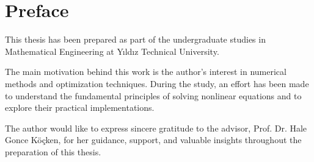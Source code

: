 \chapter*{Preface}
This thesis has been prepared as part of the undergraduate studies in Mathematical Engineering at Yıldız Technical University.

The main motivation behind this work is the author’s interest in numerical methods and optimization techniques. During the study, an effort has been made to understand the fundamental principles of solving nonlinear equations and to explore their practical implementations.

The author would like to express sincere gratitude to the advisor, Prof. Dr. Hale Gonce Köçken, for her guidance, support, and valuable insights throughout the preparation of this thesis.
\vspace{1cm}